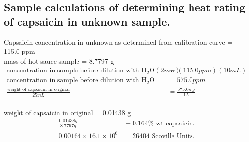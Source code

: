 \documentclass{article}
\begin{document}
\begin{center}
\vspace{2cm}

\vspace{2cm}
\newpage

\subsection*{ Sample calculations of determining heat rating of capsaicin in
unknown sample.}
\vspace{2cm}

    Capsaicin concentration in unknown as determined from calibration
    curve = 115.0 ppm \\
    mass of hot sauce sample = 8.7797 g \\

\begin{align*}
    \text{concentration in sample before dilution with H$_2$O} (2 mL) &= (115.0
    ppm) (10 mL) \\
    \text{concentration in sample before dilution with H$_2$O} &= 575.0 ppm \\
    \frac{\text{weight of capsaicin in original}}{25 mL} &= \frac{575.0 mg}{1L}
    \\
\end{align*}

weight of capsaicin in original = 0.01438 g
\begin{align*}
    \frac{0.01438g}{8.7797g} &= 0.164\% \text{ wt capsaicin.} \\
    0.00164 \times 16.1\times 10^6 &= 26404 \text{ Scoville Units.} \\
\end{align*}

\end{center}
\end{document}
